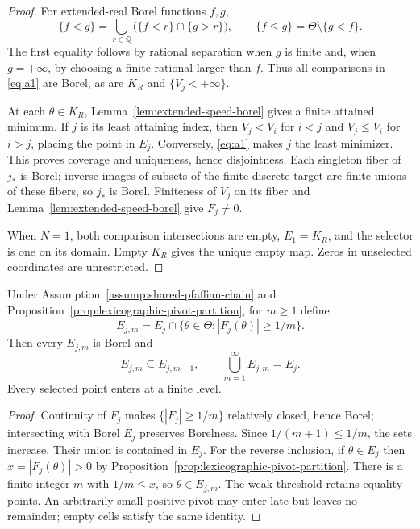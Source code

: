 \begin{proof}
For extended-real Borel functions $f,g$,
\[
\{f<g\}=\bigcup_{r\in\mathbb Q}
\bigl(\{f<r\}\cap\{g>r\}\bigr),
\qquad
\{f\leq g\}=\Theta\setminus\{g<f\}.
\tag{A2}\label{eq:a2}
\]
The first equality follows by rational separation when $g$ is finite and,
when $g=+\infty$, by choosing a finite rational larger than $f$.  Thus all
comparisons in \eqref{eq:a1} are Borel, as are $K_R$ and
$\{V_j<+\infty\}$.

At each $\theta\in K_R$, Lemma~\ref{lem:extended-speed-borel} gives a
finite attained minimum.  If $j$ is its least attaining index, then
$V_j<V_i$ for $i<j$ and $V_j\leq V_i$ for $i>j$, placing the point in
$E_j$.  Conversely, \eqref{eq:a1} makes $j$ the least minimizer.  This
proves coverage and uniqueness, hence disjointness.  Each singleton fiber
of $j_*$ is Borel; inverse images of subsets of the finite discrete target
are finite unions of these fibers, so $j_*$ is Borel.  Finiteness of $V_j$
on its fiber and Lemma~\ref{lem:extended-speed-borel} give $F_j\neq0$.

When $N=1$, both comparison intersections are empty, $E_1=K_R$, and the
selector is one on its domain.  Empty $K_R$ gives the unique empty map.
Zeros in unselected coordinates are unrestricted.
\end{proof}

\begin{lemma}
\label{lem:denominator-exhaustion}
Under Assumption~\ref{assump:shared-pfaffian-chain} and
Proposition~\ref{prop:lexicographic-pivot-partition}, for $m\geq1$ define
\[
E_{j,m}=E_j\cap\{\theta\in\Theta:|F_j(\theta)|\geq1/m\}.
\]
Then every $E_{j,m}$ is Borel and
\[
E_{j,m}\subseteq E_{j,m+1},
\qquad
\bigcup_{m=1}^\infty E_{j,m}=E_j.
\tag{A3}\label{eq:a3}
\]
Every selected point enters at a finite level.
\end{lemma}

\begin{proof}
Continuity of $F_j$ makes $\{|F_j|\geq1/m\}$ relatively closed, hence
Borel; intersecting with Borel $E_j$ preserves Borelness.  Since
$1/(m+1)\leq1/m$, the sets increase.  Their union is contained in $E_j$.
For the reverse inclusion, if $\theta\in E_j$ then
$x=|F_j(\theta)|>0$ by Proposition~\ref{prop:lexicographic-pivot-partition}.
There is a finite integer $m$ with $1/m\leq x$, so
$\theta\in E_{j,m}$.  The weak threshold retains equality points.  An
arbitrarily small positive pivot may enter late but leaves no remainder;
empty cells satisfy the same identity.
\end{proof}

